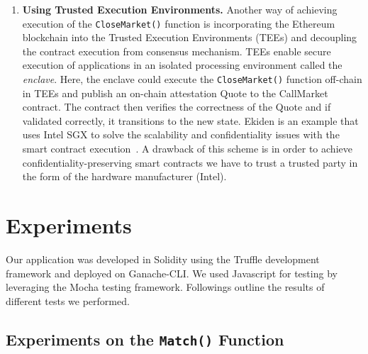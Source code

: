 \begin{enumerate}
\begin{itemize}
\end{itemize}


\item \textbf{{Using Trusted Execution Environments.}} Another way of achieving execution of the \texttt{CloseMarket()} function is incorporating the Ethereum blockchain into the Trusted Execution Environments (TEEs) and decoupling the contract execution from consensus mechanism. TEEs enable secure execution of applications in an isolated processing environment called the \textit{enclave}. Here, the enclave could execute the \texttt{CloseMarket()} function off-chain in TEEs and publish an on-chain attestation Quote to the CallMarket contract. The contract then verifies the correctness of the Quote and if validated correctly, it transitions to the new state. Ekiden is an example that uses Intel SGX to solve the scalability and confidentiality issues with the smart contract execution~\cite{cheng2019ekiden}. A drawback of this scheme is in order to achieve confidentiality-preserving smart contracts we have to trust a trusted party in the form of the hardware manufacturer (\eg Intel).


\end{enumerate}








\section{Experiments}

Our application was developed in Solidity using the Truffle development framework and deployed on Ganache-CLI. We used Javascript for testing by leveraging the Mocha testing framework. Followings outline the results of different tests we performed.


 \subsection{Experiments on the \texttt{Match()} Function}

